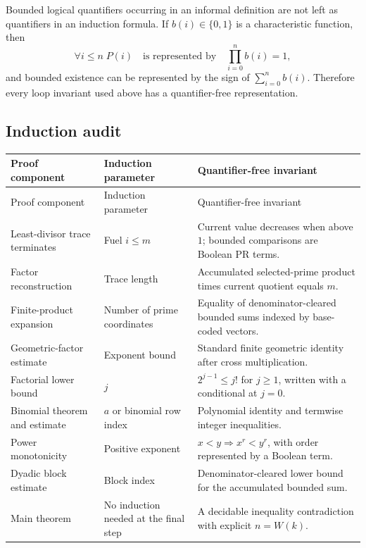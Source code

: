 \documentclass[11pt]{article}
\theoremstyle{definition}
\newcommand{\Wit}{W}
\begin{document}
Bounded logical quantifiers occurring in an informal definition are not left
as quantifiers in an induction formula.  If \(b(i)\in\{0,1\}\) is a
characteristic function, then
\[
  \forall i\leq n\;P(i)
  \quad\text{is represented by}\quad
  \prod_{i=0}^{n}b(i)=1,
\]
and bounded existence can be represented by the sign of
\(\sum_{i=0}^{n}b(i)\).  Therefore every loop invariant used above has a
quantifier-free representation.

\subsection{Induction audit}

\begin{longtable}{p{}p{}p{}}
\toprule
Proof component & Induction parameter & Quantifier-free invariant \\
\midrule
\endfirsthead
\toprule
Proof component & Induction parameter & Quantifier-free invariant \\
\midrule
\endhead
Least-divisor trace terminates & Fuel \(i\leq m\) & Current value decreases when above \(1\); bounded comparisons are Boolean PR terms. \\
Factor reconstruction & Trace length & Accumulated selected-prime product times current quotient equals \(m\). \\
Finite-product expansion & Number of prime coordinates & Equality of denominator-cleared bounded sums indexed by base-coded vectors. \\
Geometric-factor estimate & Exponent bound & Standard finite geometric identity after cross multiplication. \\
Factorial lower bound & \(j\) & \(2^{j-1}\leq j!\) for \(j\geq1\), written with a conditional at \(j=0\). \\
Binomial theorem and estimate & \(a\) or binomial row index & Polynomial identity and termwise integer inequalities. \\
Power monotonicity & Positive exponent & \(x<y\Rightarrow x^r<y^r\), with order represented by a Boolean term. \\
Dyadic block estimate & Block index & Denominator-cleared lower bound for the accumulated bounded sum. \\
Main theorem & No induction needed at the final step & A decidable inequality contradiction with explicit \(n=\Wit(k)\). \\
\bottomrule
\end{longtable}
\end{document}
